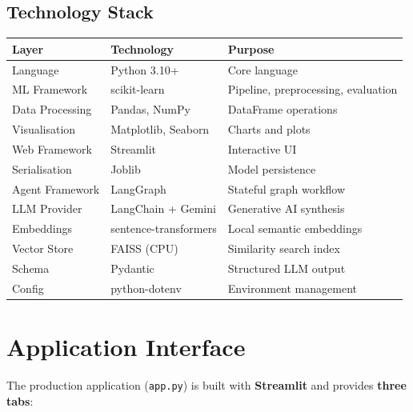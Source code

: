 \documentclass[12pt, a4paper, twoside]{article}
\newcommand{\code}[1]{\texttt{#1}}
\begin{document}
\subsection{Technology Stack}

\begin{center}
\renewcommand{\arraystretch}{1.3}
\begin{tabularx}{\textwidth}{l l X}
    \toprule
    \textbf{Layer} & \textbf{Technology} & \textbf{Purpose} \\
    \midrule
    Language        & Python 3.10+          & Core language \\
    ML Framework    & scikit-learn          & Pipeline, preprocessing,
                                              evaluation \\
    Data Processing & Pandas, NumPy         & DataFrame operations \\
    Visualisation   & Matplotlib, Seaborn   & Charts and plots \\
    Web Framework   & Streamlit             & Interactive UI \\
    Serialisation   & Joblib                & Model persistence \\
    \midrule
    Agent Framework & LangGraph             & Stateful graph workflow \\
    LLM Provider    & LangChain + Gemini    & Generative AI synthesis \\
    Embeddings      & sentence-transformers & Local semantic embeddings \\
    Vector Store    & FAISS (CPU)           & Similarity search index \\
    Schema          & Pydantic              & Structured LLM output \\
    Config          & python-dotenv         & Environment management \\
    \bottomrule
\end{tabularx}
\end{center}

\section{Application Interface}\label{sec:app}

The production application (\code{app.py}) is built with
\textbf{Streamlit} and provides \textbf{three tabs}:
\end{document}
